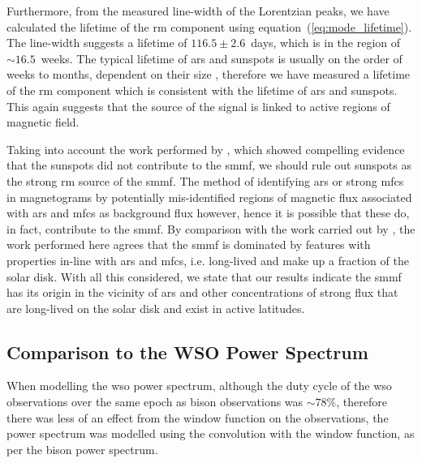 Furthermore, from the measured line-width of the Lorentzian peaks, we have calculated the lifetime of the \gls{rm} component using equation~(\ref{eq:mode_lifetime}). The line-width suggests a lifetime of $116.5 \pm 2.6$~days, which is in the region of $\sim 16.5$~weeks. The typical lifetime of \glspl{ar} and sunspots is usually on the order of weeks to months, dependent on their size \citep{zwaan_solar_1981, schrijver_photospheric_1994, howard_sunspot_2001, hathaway_sunspot_2008, van_driel-gesztelyi_evolution_2015}, therefore we have measured a lifetime of the \gls{rm} component which is consistent with the lifetime of \glspl{ar} and sunspots. This again suggests that the source of the signal is linked to active regions of magnetic field.

Taking into account the work performed by \citet{bose_variability_2018}, which showed compelling evidence that the sunspots did not contribute to the \gls{smmf}, we should rule out sunspots as the strong \gls{rm} source of the \gls{smmf}. The method of identifying \glspl{ar} or strong \glspl{mfc} in magnetograms by \citet{bose_variability_2018} potentially mis-identified regions of magnetic flux associated with \glspl{ar} and \glspl{mfc} as background flux however, hence it is possible that these do, in fact, contribute to the \gls{smmf}. By comparison with the work carried out by \citet{kutsenko_contribution_2017}, the work performed here agrees that the \gls{smmf} is dominated by features with properties in-line with \glspl{ar} and \glspl{mfc}, i.e. long-lived and make up a fraction of the solar disk. With all this considered, we state that our results indicate the \gls{smmf} has its origin in the vicinity of \glspl{ar} and other concentrations of strong flux that are long-lived on the solar disk and exist in active latitudes.


\subsection{Comparison to the WSO Power Spectrum}\label{sec:WSO_reults}

When modelling the \gls{wso} power spectrum, although the duty cycle of the \gls{wso} observations over the same epoch as \gls{bison} observations was $\sim 78\%$, therefore there was less of an effect from the window function on the observations, the power spectrum was modelled using the convolution with the window function, as per the \gls{bison} power spectrum.

